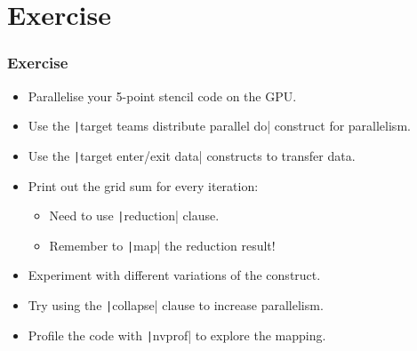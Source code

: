 \documentclass[aspectratio=169]{beamer}
\begin{document}
\section{Exercise}
\begin{frame}
\frametitle{Exercise}
\begin{itemize}
  \item Parallelise your 5-point stencil code on the GPU.
  \item Use the \texttt|target teams distribute parallel do| construct for parallelism.
  \item Use the \texttt|target enter/exit data| constructs to transfer data.
  \item Print out the grid sum for every iteration:
    \begin{itemize}
      \item Need to use \texttt|reduction| clause.
      \item Remember to \texttt|map| the reduction result!
    \end{itemize}
  \item Experiment with different variations of the construct.
  \item Try using the \texttt|collapse| clause to increase parallelism.
  \item Profile the code with \texttt|nvprof| to explore the mapping.
\end{itemize}
\end{frame}



\end{document}
